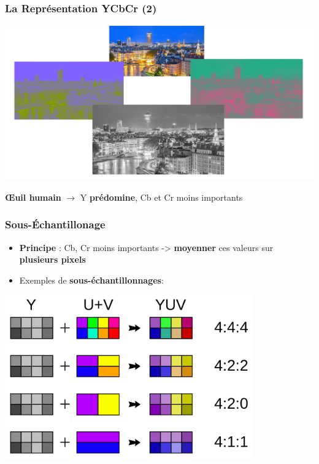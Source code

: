 \documentclass{beamer}
\begin{document}
\begin{frame}
    \frametitle{La Représentation YCbCr (2)}
    
    \centering
    \includegraphics[width=\textwidth]{img/diff_YCbCr.png}

    \textbf{\OE{uil} humain} $\rightarrow$ Y \textbf{prédomine}, Cb et Cr moins importants

\end{frame}

\begin{frame}
    \frametitle{Sous-\'Echantillonage}

    \begin{itemize}
        \item \textbf{Principe} : Cb, Cr moins importants -> \textbf{moyenner} ces valeurs sur \textbf{plusieurs pixels}
        \item Exemples de \textbf{sous-échantillonnages}: 
    \end{itemize}

    \centering
    \includegraphics[width=0.8\textwidth]{img/chromaSubSampling.png}

\end{frame}
\end{document}
